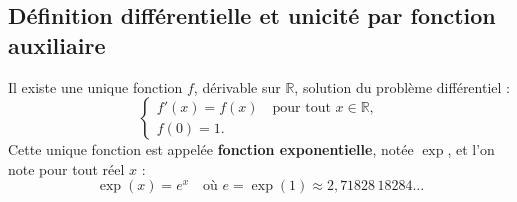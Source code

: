 \documentclass[11pt,a4paper]{article}
\newcommand{\R}{\mathbb{R}}
\begin{document}
\subsection{Définition différentielle et unicité par fonction auxiliaire}

\begin{theoremebox}
Il existe une unique fonction $f$, dérivable sur $\R$, solution du problème différentiel :
\[
\begin{cases}
f'(x) = f(x) \quad \text{pour tout } x \in \R, \\
f(0) = 1.
\end{cases}
\]
Cette unique fonction est appelée \textbf{fonction exponentielle}, notée $\exp$, et l'on note pour tout réel $x$ :
\[
\exp(x) = e^x \quad \text{où } e = \exp(1) \approx 2{,}71828\,18284\dots
\]
\end{theoremebox}
\end{document}
